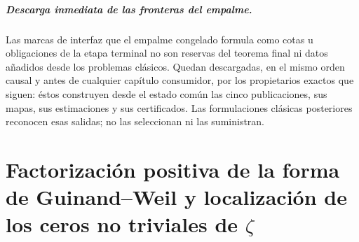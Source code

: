 \paragraph{Descarga inmediata de las fronteras del empalme.}
Las marcas de interfaz que el empalme congelado formula como cotas u
obligaciones de la etapa terminal no son reservas del teorema final ni datos
añadidos desde los problemas clásicos. Quedan descargadas, en el mismo orden
causal y antes de cualquier capítulo consumidor, por los propietarios exactos
que siguen: éstos construyen desde el estado común las cinco publicaciones,
sus mapas, sus estimaciones y sus certificados. Las formulaciones clásicas
posteriores reconocen esas salidas; no las seleccionan ni las suministran.
\begin{HMTScientificOwnerSubordinated}

\end{HMTScientificOwnerSubordinated}


\begingroup
\HMTDemoteHeadings

\endgroup

\chapter{Factorización positiva de la forma de Guinand--Weil y localización de los ceros no triviales de \texorpdfstring{\(\zeta\)}{zeta}}
\begingroup
\renewcommand{\chapter}[2][]{}%

\endgroup


\chapter{Caracterización Cayley--Pontryagin de los ceros críticos y construcción coinductiva del campo espectral de Weil}
\begingroup
\renewcommand{\chapter}[2][]{}%

\endgroup


